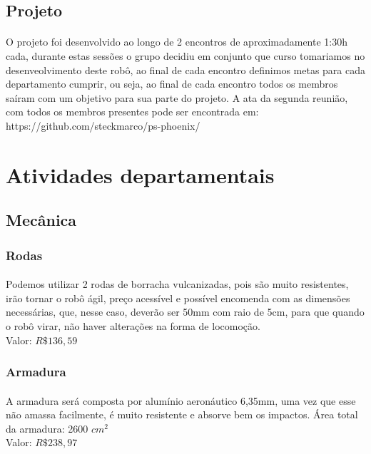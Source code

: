 \documentclass{article}
\begin{document}
        \subsection{Projeto}
        \paragraph{}
        O projeto foi desenvolvido ao longo de 2 encontros de aproximadamente 1:30h cada, durante estas sessões o grupo
        decidiu em conjunto que curso tomariamos no desenveolvimento deste robô, ao final de cada encontro definimos
        metas para cada departamento cumprir, ou seja, ao final de cada encontro todos os membros saíram com um
        objetivo para sua parte do projeto. A ata da segunda reunião, com todos os membros presentes pode ser
        encontrada em: https://github.com/steckmarco/ps-phoenix/

    \section{Atividades departamentais}
        \subsection{Mecânica}
            \subsubsection{Rodas}
                \paragraph{}
                Podemos utilizar 2 rodas de borracha vulcanizadas, pois são muito resistentes, irão tornar o robô ágil, preço acessível e possível encomenda com as dimensões necessárias, que, nesse caso, deverão ser 50mm com raio de 5cm, para que quando o robô virar, não haver alterações na forma de locomoção.
                \\
                Valor: $R\$136,59$
            \subsubsection{Armadura}
                \paragraph{}
                A armadura será composta por alumínio aeronáutico 6,35mm, uma vez que esse não amassa facilmente, é muito resistente e absorve bem os impactos.
                Área total da armadura: 2600 $cm^2$
                \\
                Valor: $R\$238,97$
\end{document}
